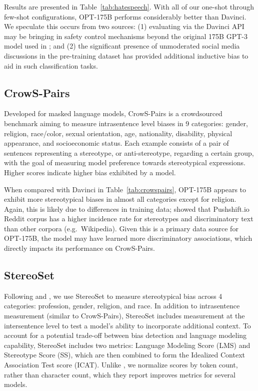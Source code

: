 Results are presented in Table~\ref{tab:hatespeech}.
With all of our one-shot through few-shot configurations, {OPT-175B} performs considerably better than {Davinci}. We speculate this occurs from two sources: (1) evaluating via the {Davinci} API may be bringing in safety control mechanisms beyond the original 175B {GPT-3} model used in \citet{brown2020gpt3}; and (2) the significant presence of unmoderated social media discussions in the pre-training dataset has provided additional inductive bias to aid in such classification tasks.

\subsection{CrowS-Pairs}
Developed for masked language models, CrowS-Pairs \cite{nangia2020crows} is a crowdsourced benchmark aiming to measure intrasentence level biases in 9 categories: gender, religion, race/color, sexual orientation, age, nationality, disability, physical appearance, and socioeconomic status. Each example consists of a pair of sentences representing a stereotype, or anti-stereotype, regarding a certain group, with the goal of measuring model preference towards stereotypical expressions.  Higher scores indicate higher bias exhibited by a model.

When compared with {Davinci} in Table~\ref{tab:crowspairs}, {OPT-175B} appears to exhibit more stereotypical biases in almost all categories except for religion.  Again, this is likely due to differences in training data;  \citet{nangia2020crows} showed that Pushshift.io Reddit corpus has a higher incidence rate for stereotypes and discriminatory text than other corpora (e.g.~Wikipedia). Given this is a primary data source for {OPT-175B}, the model may have learned more discriminatory associations, which directly impacts its performance on CrowS-Pairs. 

\subsection{StereoSet}

Following \citet{J1WhitePaper} and \citet{1TMoE2021}, we use StereoSet \cite{nadeem2020stereoset} to measure stereotypical bias across 4 categories: profession, gender, religion, and race.  In addition to intrasentence measurement (similar to CrowS-Pairs), StereoSet includes  measurement at the intersentence level to test a model's ability to incorporate additional context.  To account for a potential trade-off between bias detection and language modeling capability, StereoSet includes two metrics: Language Modeling Score (LMS) and Stereotype Score (SS), which are then combined to form the Idealized Context Association Test score (ICAT). Unlike \citet{J1WhitePaper}, we normalize scores by token count, rather than character count, which they report improves metrics for several models.

